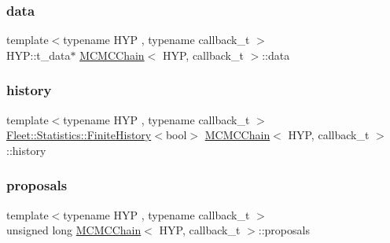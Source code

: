 \mbox{\label{class_m_c_m_c_chain_a62ffa9a3d173a79c82f09174b58aebaf}} 
\subsubsection{\texorpdfstring{data}{data}}
{\footnotesize\ttfamily template$<$typename H\+YP , typename callback\+\_\+t $>$ \\
H\+Y\+P\+::t\+\_\+data$\ast$ \hyperlink{class_m_c_m_c_chain}{M\+C\+M\+C\+Chain}$<$ H\+YP, callback\+\_\+t $>$\+::data}

\mbox{\label{class_m_c_m_c_chain_a2595f417e0c9cc847ac1dd70ed8b0763}} 
\subsubsection{\texorpdfstring{history}{history}}
{\footnotesize\ttfamily template$<$typename H\+YP , typename callback\+\_\+t $>$ \\
\hyperlink{class_fleet_1_1_statistics_1_1_finite_history}{Fleet\+::\+Statistics\+::\+Finite\+History}$<$bool$>$ \hyperlink{class_m_c_m_c_chain}{M\+C\+M\+C\+Chain}$<$ H\+YP, callback\+\_\+t $>$\+::history}

\mbox{\label{class_m_c_m_c_chain_aec2cdd6a3e25447c7f34e31d0d98dbcb}} 
\subsubsection{\texorpdfstring{proposals}{proposals}}
{\footnotesize\ttfamily template$<$typename H\+YP , typename callback\+\_\+t $>$ \\
unsigned long \hyperlink{class_m_c_m_c_chain}{M\+C\+M\+C\+Chain}$<$ H\+YP, callback\+\_\+t $>$\+::proposals}

\mbox{\label{class_m_c_m_c_chain_ad51e645f9de68d3f008b62ada6375099}} 
